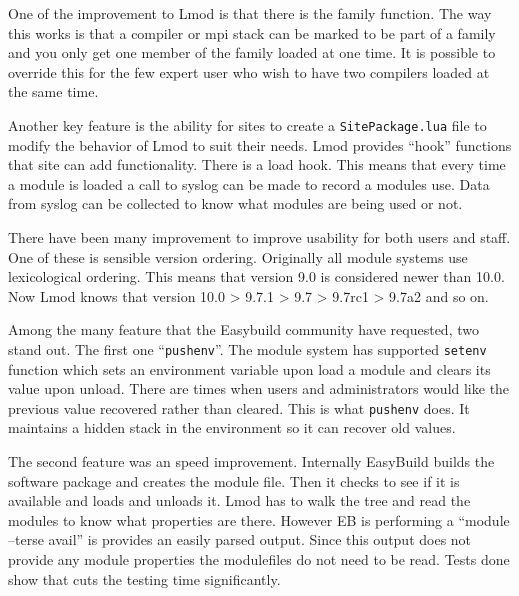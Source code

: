 One of the improvement to Lmod is that there is the family function.
The way this works is that a compiler or mpi stack can be marked to be
part of a family and you only get one member of the family loaded at
one time.  It is possible to override this for the few expert user who
wish to have two compilers loaded at the same time.

Another key feature is the ability for sites to create a
\texttt{SitePackage.lua} file to modify the behavior of Lmod to suit
their needs.  Lmod provides ``hook'' functions that site can add
functionality.  There is a load hook.  This means that
every time a module is loaded a call to syslog can be
made to record a modules use.  Data from syslog can be collected to
know what modules are being used or not.

There have been many improvement to improve usability for both users
and staff.  One of these is sensible version ordering.  Originally all
module systems use lexicological ordering.  This means that version
9.0 is considered newer than 10.0.  Now Lmod knows that version 10.0 >
9.7.1 > 9.7 > 9.7rc1 > 9.7a2 and so on.

Among the many feature that the Easybuild community have requested,
two stand out.  The first one ``\texttt{pushenv}''.  The module system
has supported \texttt{setenv} function which sets an environment variable 
upon load a module and clears its value upon unload.  There are times
when users and administrators would like the previous value recovered
rather than cleared.  This is what \texttt{pushenv} does.  It
maintains a hidden stack in the environment so it can recover old
values.

The second feature was an speed improvement.  Internally EasyBuild
builds the software package and creates the module file.  Then it
checks to see if it is available and loads and unloads it.  Lmod has
to walk the tree and read the modules to know what properties are
there. However EB is performing a ``module --terse avail'' is provides
an easily parsed output.  Since this output does not provide any
module properties the modulefiles do not need to be read.  Tests done
show that cuts the testing time significantly.

